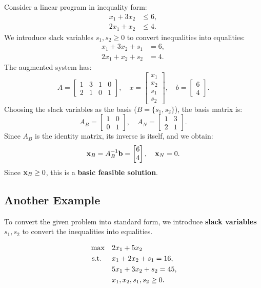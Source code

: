 Consider a linear program in inequality form:
\[
\begin{aligned}
    x_1 + 3x_2 &\leq 6, \\
    2x_1 + x_2 &\leq 4.
\end{aligned}
\]
We introduce slack variables \( s_1, s_2 \geq 0 \) to convert inequalities into equalities:
\[
\begin{aligned}
    x_1 + 3x_2 + s_1 &= 6, \\
    2x_1 + x_2 + s_2 &= 4.
\end{aligned}
\]
The augmented system has:
\[
A =
\begin{bmatrix}
    1 & 3 & 1 & 0 \\
    2 & 1 & 0 & 1
\end{bmatrix}, \quad
x =
\begin{bmatrix}
    x_1 \\ x_2 \\ s_1 \\ s_2
\end{bmatrix}, \quad
b =
\begin{bmatrix}
    6 \\ 4
\end{bmatrix}.
\]
Choosing the slack variables as the basis (\(B= \{s_1, s_2\} \)), the basis matrix is:
\[
A_B =
\begin{bmatrix}
    1 & 0 \\
    0 & 1
\end{bmatrix}, \quad A_N =
\begin{bmatrix}
    1 & 3 \\
    2 & 1
\end{bmatrix}.
\]
Since \( A_B \) is the identity matrix, its inverse is itself, and we obtain:
\[
\mathbf{x}_B = A_B^{-1}\mathbf{b}= 
\begin{bmatrix}
    6 \\ 4
\end{bmatrix}, \quad \mathbf{x}_N = 0.
\]
Since \( \mathbf{x}_B \geq 0 \), this is a \textbf{basic feasible solution}.

\subsection{Another Example}

To convert the given problem into standard form, we introduce \textbf{slack variables} \( s_1, s_2 \) to convert the inequalities into equalities.

\[
\begin{aligned}
    \max \quad & 2 x_1 + 5 x_2 \\
    \text{ s.t. } \quad 
    & x_1 + 2x_2 + s_1 = 16, \\
    & 5x_1 + 3x_2 + s_2 = 45, \\
    & x_1, x_2, s_1, s_2 \geq 0.
\end{aligned}
\]

